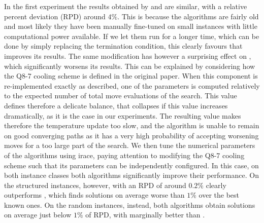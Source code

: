 In the first experiment the results obtained by \brsa and \qsa are similar, with a relative percent 
deviation (RPD) around $4\%$. This is because the algorithms are fairly old and 
most likely they have been manually
fine-tuned on small instances with little computational power available. 
If we let them run for a longer time, 
which can be done by simply replacing the termination condition,
this clearly favours \brsa that improves its results. 
The same modification has however a surprising effect on \qsa, which 
significantly worsens its results. This can be explained by considering 
how the Q8-7 cooling scheme is defined in the original paper. When 
this component is re-implemented exactly as described, one of the parameters
is computed relatively to the expected number of total move 
evaluations of the search. This value defines
therefore a delicate balance, that collapses if this value 
increases dramatically, as it is the case in our experiments. The resulting 
value makes therefore the temperature update too slow, and the algorithm
is unable to remain on good converging paths as it has a very high probability
of accepting worsening moves for a too large part of the search. 
We then tune the numerical parameters of the algorithms using irace, paying
attention to modifying the Q8-7 cooling scheme such that its parameters
can be independently configured. In this case, on both instance classes
both algorithms significantly improve their performance. 
On the structured instances, however, \brsa with an RPD of around $0.2\%$ 
clearly outperforms \qsa, which finds solutions on average worse than $1\%$ 
over the best known ones. On the random instances, instead, both algorithms obtain 
solutions on average just below $1\%$ of RPD, with \brsa marginally better than \qsa.

